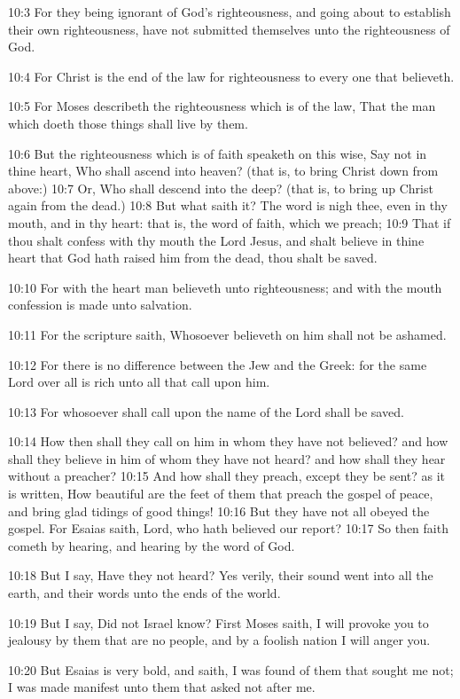 10:3 For they being ignorant of God's righteousness, and going about
to establish their own righteousness, have not submitted themselves
unto the righteousness of God.

10:4 For Christ is the end of the law for righteousness to every one
that believeth.

10:5 For Moses describeth the righteousness which is of the law, That
the man which doeth those things shall live by them.

10:6 But the righteousness which is of faith speaketh on this wise,
Say not in thine heart, Who shall ascend into heaven? (that is, to
bring Christ down from above:) 10:7 Or, Who shall descend into the
deep? (that is, to bring up Christ again from the dead.)  10:8 But
what saith it? The word is nigh thee, even in thy mouth, and in thy
heart: that is, the word of faith, which we preach; 10:9 That if thou
shalt confess with thy mouth the Lord Jesus, and shalt believe in
thine heart that God hath raised him from the dead, thou shalt be
saved.

10:10 For with the heart man believeth unto righteousness; and with
the mouth confession is made unto salvation.

10:11 For the scripture saith, Whosoever believeth on him shall not be
ashamed.

10:12 For there is no difference between the Jew and the Greek: for
the same Lord over all is rich unto all that call upon him.

10:13 For whosoever shall call upon the name of the Lord shall be
saved.

10:14 How then shall they call on him in whom they have not believed?
and how shall they believe in him of whom they have not heard? and how
shall they hear without a preacher?  10:15 And how shall they preach,
except they be sent? as it is written, How beautiful are the feet of
them that preach the gospel of peace, and bring glad tidings of good
things!  10:16 But they have not all obeyed the gospel. For Esaias
saith, Lord, who hath believed our report?  10:17 So then faith cometh
by hearing, and hearing by the word of God.

10:18 But I say, Have they not heard? Yes verily, their sound went
into all the earth, and their words unto the ends of the world.

10:19 But I say, Did not Israel know? First Moses saith, I will
provoke you to jealousy by them that are no people, and by a foolish
nation I will anger you.

10:20 But Esaias is very bold, and saith, I was found of them that
sought me not; I was made manifest unto them that asked not after me.

